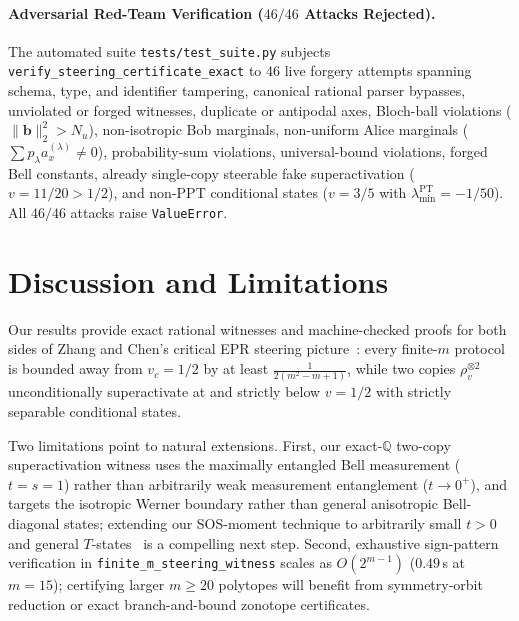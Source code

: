 \documentclass[11pt,a4paper]{article}
\theoremstyle{definition}
\theoremstyle{remark}
\newcommand{\QQ}{\mathbb{Q}}
\begin{document}
\paragraph{Adversarial Red-Team Verification ($46/46$ Attacks Rejected).}
The automated suite \texttt{tests/test\_suite.py} subjects \texttt{verify\_steering\_\allowbreak certificate\_\allowbreak exact} to $46$ live forgery attempts spanning schema, type, and identifier tampering, canonical rational parser bypasses, unviolated or forged witnesses, duplicate or antipodal axes, Bloch-ball violations ($\|\mathbf{b}\|_2^2 > N_u$), non-isotropic Bob marginals, non-uniform Alice marginals ($\sum p_\lambda a_x^{(\lambda)} \ne 0$), probability-sum violations, universal-bound violations, forged Bell constants, already single-copy steerable fake superactivation ($v = 11/20 > 1/2$), and non-PPT conditional states ($v=3/5$ with $\lambda_{\min}^{\mathrm{PT}} = -1/50$). All $46/46$ attacks raise \texttt{ValueError}.

\section{Discussion and Limitations}

Our results provide exact rational witnesses and machine-checked proofs for both sides of Zhang and Chen's critical EPR steering picture~\cite{zhang2026critical}: every finite-$m$ protocol is bounded away from $v_c = 1/2$ by at least $\frac{1}{2(m^2-m+1)}$, while two copies $\rho_v^{\otimes 2}$ unconditionally superactivate at and strictly below $v = 1/2$ with strictly separable conditional states.

Two limitations point to natural extensions. First, our exact-$\QQ$ two-copy superactivation witness uses the maximally entangled Bell measurement ($t=s=1$) rather than arbitrarily weak measurement entanglement ($t \to 0^+$), and targets the isotropic Werner boundary rather than general anisotropic Bell-diagonal states; extending our SOS-moment technique to arbitrarily small $t > 0$ and general $T$-states~\cite{jevtic2015einstein} is a compelling next step. Second, exhaustive sign-pattern verification in \texttt{finite\_m\_steering\_witness} scales as $O(2^{m-1})$ ($0.49$\,s at $m=15$); certifying larger $m \ge 20$ polytopes will benefit from symmetry-orbit reduction or exact branch-and-bound zonotope certificates.



\end{document}
